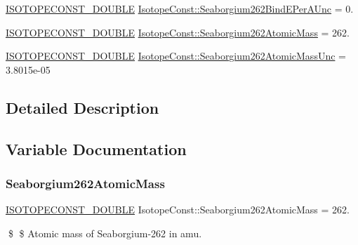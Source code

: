 \begin{DoxyCompactItemize}
\item 
\mbox{\hyperlink{group___isotope_const-_macros_ga8f45a7272ce02c0b4c65c44636ed719a}{I\+S\+O\+T\+O\+P\+E\+C\+O\+N\+S\+T\+\_\+\+D\+O\+U\+B\+LE}} \mbox{\hyperlink{group___isotope_const-_seaborgium-_sg262_ga690b349628997d30858538596a4db2de}{Isotope\+Const\+::\+Seaborgium262\+Bind\+E\+Per\+A\+Unc}} = 0.
\item 
\mbox{\hyperlink{group___isotope_const-_macros_ga8f45a7272ce02c0b4c65c44636ed719a}{I\+S\+O\+T\+O\+P\+E\+C\+O\+N\+S\+T\+\_\+\+D\+O\+U\+B\+LE}} \mbox{\hyperlink{group___isotope_const-_seaborgium-_sg262_ga8cf69f3a4936b081fb1d19232a753bb9}{Isotope\+Const\+::\+Seaborgium262\+Atomic\+Mass}} = 262.
\item 
\mbox{\hyperlink{group___isotope_const-_macros_ga8f45a7272ce02c0b4c65c44636ed719a}{I\+S\+O\+T\+O\+P\+E\+C\+O\+N\+S\+T\+\_\+\+D\+O\+U\+B\+LE}} \mbox{\hyperlink{group___isotope_const-_seaborgium-_sg262_gaa8347733f915dee952ca7d49a2002718}{Isotope\+Const\+::\+Seaborgium262\+Atomic\+Mass\+Unc}} = 3.\+8015e-\/05
\end{DoxyCompactItemize}


\subsection{Detailed Description}


\subsection{Variable Documentation}
\mbox{\label{group___isotope_const-_seaborgium-_sg262_ga8cf69f3a4936b081fb1d19232a753bb9}} 
\subsubsection{\texorpdfstring{Seaborgium262\+Atomic\+Mass}{Seaborgium262AtomicMass}}
{\footnotesize\ttfamily \mbox{\hyperlink{group___isotope_const-_macros_ga8f45a7272ce02c0b4c65c44636ed719a}{I\+S\+O\+T\+O\+P\+E\+C\+O\+N\+S\+T\+\_\+\+D\+O\+U\+B\+LE}} Isotope\+Const\+::\+Seaborgium262\+Atomic\+Mass = 262.}

\$ \$ Atomic mass of Seaborgium-\/262 in amu. \mbox{\label{group___isotope_const-_seaborgium-_sg262_gaa8347733f915dee952ca7d49a2002718}} 
